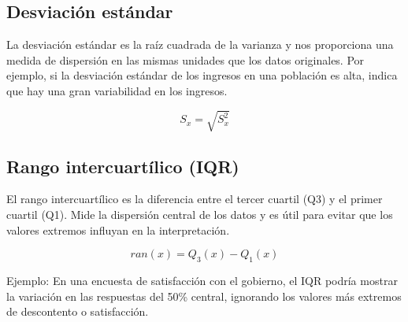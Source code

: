 \documentclass[
  letterpaper,
  DIV=11,
  numbers=noendperiod]{scrreprt}
\begin{document}
\subsection{Desviación estándar}\label{desviaciuxf3n-estuxe1ndar}

La desviación estándar es la raíz cuadrada de la varianza y nos
proporciona una medida de dispersión en las mismas unidades que los
datos originales. Por ejemplo, si la desviación estándar de los ingresos
en una población es alta, indica que hay una gran variabilidad en los
ingresos.

\begin{tcolorbox}[enhanced jigsaw, toprule=.15mm, opacitybacktitle=0.6, toptitle=1mm, arc=.35mm, left=2mm, title=\textcolor{quarto-callout-warning-color}{\faExclamationTriangle}\hspace{0.5em}{Warning}, titlerule=0mm, leftrule=.75mm, rightrule=.15mm, coltitle=black, bottomtitle=1mm, bottomrule=.15mm, colframe=quarto-callout-warning-color-frame, opacityback=0, colback=white, breakable, colbacktitle=quarto-callout-warning-color!10!white]

\[ S_x =\sqrt{S_x^2}\]

\end{tcolorbox}

\subsection{Rango intercuartílico
(IQR)}\label{rango-intercuartuxedlico-iqr}

El rango intercuartílico es la diferencia entre el tercer cuartil (Q3) y
el primer cuartil (Q1). Mide la dispersión central de los datos y es
útil para evitar que los valores extremos influyan en la interpretación.

\begin{tcolorbox}[enhanced jigsaw, toprule=.15mm, opacitybacktitle=0.6, toptitle=1mm, arc=.35mm, left=2mm, title=\textcolor{quarto-callout-warning-color}{\faExclamationTriangle}\hspace{0.5em}{Warning}, titlerule=0mm, leftrule=.75mm, rightrule=.15mm, coltitle=black, bottomtitle=1mm, bottomrule=.15mm, colframe=quarto-callout-warning-color-frame, opacityback=0, colback=white, breakable, colbacktitle=quarto-callout-warning-color!10!white]

\[ran(x) = Q_{3}(x) - Q_{1}(x)\]

\end{tcolorbox}

Ejemplo: En una encuesta de satisfacción con el gobierno, el IQR podría
mostrar la variación en las respuestas del 50\% central, ignorando los
valores más extremos de descontento o satisfacción.
\end{document}
